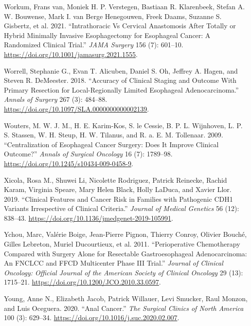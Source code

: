 \documentclass[
  letterpaper,
]{scrbook}
\newlength{\cslhangindent}
\newenvironment{CSLReferences}[2] %
 {\begin{list}{}{%
  \setlength{\itemindent}{0pt}
  \setlength{\leftmargin}{0pt}
  \setlength{\parsep}{0pt}
  \ifodd #1
   \setlength{\leftmargin}{\cslhangindent}
   \setlength{\itemindent}{-1\cslhangindent}
  \fi
  \setlength{\itemsep}{#2\baselineskip}}}
 {\end{list}}
\begin{document}
\begin{CSLReferences}{1}{0}
Workum, Frans van, Moniek H. P. Verstegen, Bastiaan R. Klarenbeek,
Stefan A. W. Bouwense, Mark I. van Berge Henegouwen, Freek Daams,
Suzanne S. Gisbertz, et al. 2021. {``Intrathoracic Vs {Cervical}
{Anastomosis} {After} {Totally} or {Hybrid} {Minimally} {Invasive}
{Esophagectomy} for {Esophageal} {Cancer}: {A} {Randomized} {Clinical}
{Trial}.''} \emph{JAMA Surgery} 156 (7): 601--10.
\url{https://doi.org/10.1001/jamasurg.2021.1555}.

Worrell, Stephanie G., Evan T. Alicuben, Daniel S. Oh, Jeffrey A. Hagen,
and Steven R. DeMeester. 2018. {``Accuracy of {Clinical} {Staging} and
{Outcome} {With} {Primary} {Resection} for {Local}-{Regionally}
{Limited} {Esophageal} {Adenocarcinoma}.''} \emph{Annals of Surgery} 267
(3): 484--88. \url{https://doi.org/10.1097/SLA.0000000000002139}.

Wouters, M. W. J. M., H. E. Karim-Kos, S. le Cessie, B. P. L. Wijnhoven,
L. P. S. Stassen, W. H. Steup, H. W. Tilanus, and R. a. E. M. Tollenaar.
2009. {``Centralization of Esophageal Cancer Surgery: Does It Improve
Clinical Outcome?''} \emph{Annals of Surgical Oncology} 16 (7):
1789--98. \url{https://doi.org/10.1245/s10434-009-0458-9}.

Xicola, Rosa M., Shuwei Li, Nicolette Rodriguez, Patrick Reinecke,
Rachid Karam, Virginia Speare, Mary Helen Black, Holly LaDuca, and
Xavier Llor. 2019. {``Clinical Features and Cancer Risk in Families with
Pathogenic {CDH1} Variants Irrespective of Clinical Criteria.''}
\emph{Journal of Medical Genetics} 56 (12): 838--43.
\url{https://doi.org/10.1136/jmedgenet-2019-105991}.

Ychou, Marc, Valérie Boige, Jean-Pierre Pignon, Thierry Conroy, Olivier
Bouché, Gilles Lebreton, Muriel Ducourtieux, et al. 2011.
{``Perioperative Chemotherapy Compared with Surgery Alone for Resectable
Gastroesophageal Adenocarcinoma: An {FNCLCC} and {FFCD} Multicenter
Phase {III} Trial.''} \emph{Journal of Clinical Oncology: Official
Journal of the American Society of Clinical Oncology} 29 (13): 1715--21.
\url{https://doi.org/10.1200/JCO.2010.33.0597}.

Young, Anne N., Elizabeth Jacob, Patrick Willauer, Levi Smucker, Raul
Monzon, and Luis Oceguera. 2020. {``Anal {Cancer}.''} \emph{The Surgical
Clinics of North America} 100 (3): 629--34.
\url{https://doi.org/10.1016/j.suc.2020.02.007}.


\end{CSLReferences}
\end{document}

